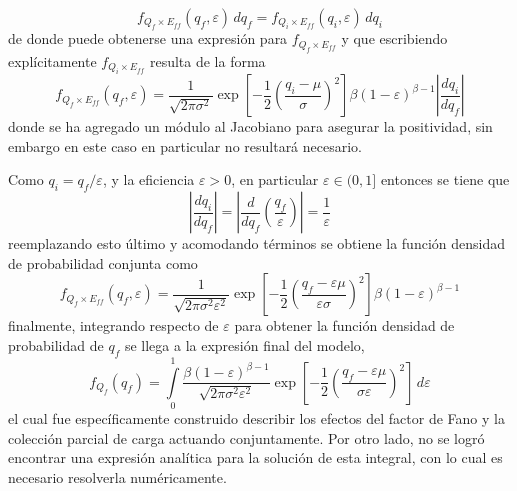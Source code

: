 \begin{equation*}
    f_{Q_{f}\times E_{ff}}(q_{f}, \varepsilon)\,dq_{f} =
    f_{Q_{i}\times E_{ff}}(q_{i}, \varepsilon)\,dq_{i}
\end{equation*}
de donde puede obtenerse una expresión para $f_{Q_{f}\times E_{ff}}$ y que escribiendo explícitamente $f_{Q_{i}\times E_{ff}}$ resulta de la forma
\begin{equation*}
    f_{Q_{f}\times E_{ff}}(q_{f}, \varepsilon)
    = 
    \frac{1}{\sqrt{2\pi \sigma^{2}}}
    \exp
        \left[
            -\frac{1}{2}
            \left(
                \frac{q_{i} - \mu}{\sigma}
            \right)^{2}
        \right]
    \beta(1-\varepsilon)^{\beta - 1}
    \left|
        \frac{dq_{i}}{dq_{f}}
    \right|
\end{equation*}
donde se ha agregado un módulo al Jacobiano para asegurar la positividad, sin embargo en este caso en particular no resultará necesario. 

Como $q_{i} = q_{f}/\varepsilon$, y la eficiencia $\varepsilon > 0$, en particular $\varepsilon \in (0, 1]$ entonces se tiene que 
\begin{equation*}
    \left|
        \frac{dq_{i}}{dq_{f}}
    \right|
        = 
    \left|
        \frac{d}{dq_{f}}
        \left(
            \frac{q_{f}}{\varepsilon}
        \right)
    \right|
        = 
        \frac{1}{\varepsilon}
\end{equation*}
reemplazando esto último y acomodando términos se obtiene la función densidad de probabilidad conjunta como
\begin{equation*}
    f_{Q_{f}\times E_{ff}}(q_{f}, \varepsilon)
    = 
    \frac{1}{\sqrt{2\pi \sigma^{2}\varepsilon^{2}}}
    \exp
        \left[
            -\frac{1}{2}
            \left(
                \frac{q_{f} - \varepsilon\mu}{\varepsilon\sigma}
            \right)^{2}
        \right]
    \beta(1-\varepsilon)^{\beta - 1}
\end{equation*}
finalmente, integrando respecto de $\varepsilon$ para obtener la función densidad de probabilidad de $q_{f}$ se llega a la expresión final del modelo,
\begin{equation}
    f_{Q_{f}}(q_{f}) = 
    \int\limits_{0}^{1}
    \frac{\beta(1-\varepsilon)^{\beta - 1}}{\sqrt{2\pi \sigma^{2}\varepsilon^{2}}}
    \exp
        \left[
            -\frac{1}{2}
            \left(
                \frac{q_{f} - \varepsilon\mu}{\sigma\varepsilon}
            \right)^{2}
        \right]\,
    d\varepsilon
    \label{ec:DistribucionFinal}
\end{equation}
el cual fue específicamente construido describir los efectos del factor de Fano y la colección parcial de carga actuando conjuntamente. Por otro lado, no se logró encontrar una expresión analítica para la solución de esta integral, con lo cual es necesario resolverla numéricamente.

